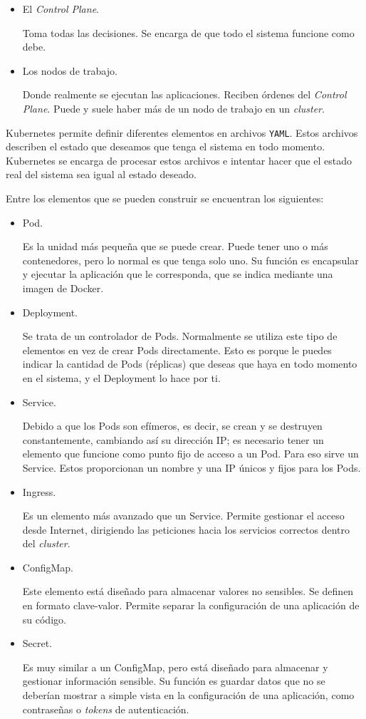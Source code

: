 \begin{itemize}
  \item El \textit{Control Plane}.

    Toma todas las decisiones. Se encarga de que todo el sistema funcione como debe.

  \item Los nodos de trabajo.

    Donde realmente se ejecutan las aplicaciones. Reciben órdenes del \textit{Control Plane}. Puede y suele haber más de un nodo de trabajo en un \textit{cluster}.
\end{itemize}

Kubernetes permite definir diferentes elementos en archivos \texttt{YAML}. Estos archivos describen el estado que deseamos que tenga el sistema en todo momento. Kubernetes se encarga de procesar estos archivos e intentar hacer que el estado real del sistema sea igual al estado deseado.

Entre los elementos que se pueden construir se encuentran los siguientes:

\begin{itemize}
  \item Pod.

    Es la unidad más pequeña que se puede crear. Puede tener uno o más contenedores, pero lo normal es que tenga solo uno. Su función es encapsular y ejecutar la aplicación que le corresponda, que se indica mediante una imagen de Docker.
  \item Deployment.

    Se trata de un controlador de Pods. Normalmente se utiliza este tipo de elementos en vez de crear Pods directamente. Esto es porque le puedes indicar la cantidad de Pods (réplicas) que deseas que haya en todo momento en el sistema, y el Deployment lo hace por ti.
  \item Service.

    Debido a que los Pods son efímeros, es decir, se crean y se destruyen constantemente, cambiando así su dirección IP; es necesario tener un elemento que funcione como punto fijo de acceso a un Pod. Para eso sirve un Service. Estos proporcionan un nombre y una IP únicos y fijos para los Pods.
  \item Ingress.

    Es un elemento más avanzado que un Service. Permite gestionar el acceso desde Internet, dirigiendo las peticiones hacia los servicios correctos dentro del \textit{cluster}.

  \item ConfigMap.

    Este elemento está diseñado para almacenar valores no sensibles. Se definen en formato clave-valor. Permite separar la configuración de una aplicación de su código.

  \item Secret.

    Es muy similar a un ConfigMap, pero está diseñado para almacenar y gestionar información sensible. Su función es guardar datos que no se deberían mostrar a simple vista en la configuración de una aplicación, como contraseñas o \textit{tokens} de autenticación.
\end{itemize}

